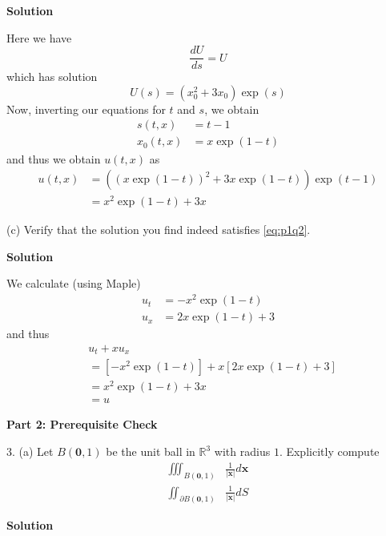\documentclass{article}
\begin{document}
\textbf{Solution}

Here we have
%
\begin{equation*}
    \frac{d U}{d s} = U
\end{equation*}
%
which has solution
%
\begin{equation*}
    U(s) = (x_0^2 + 3 x_0) \exp(s)
\end{equation*}
%
Now, inverting our equations for $t$ and $s$, we obtain
%
\begin{align*}
    s(t, x) &= t - 1 \\
    x_0(t, x) &= x \exp(1 - t)
\end{align*}
%
and thus we obtain $u(t, x)$ as
%
\begin{align*}
    u(t, x) &= ((x \exp(1 - t))^2 + 3 x \exp(1 - t)) \exp(t - 1) \\
            &= x^2 \exp(1 - t) + 3 x
\end{align*}
%

\vspace{5mm}
(c) Verify that the solution you find indeed satisfies \eqref{eq:p1q2}.

\textbf{Solution}

We calculate (using Maple)
%
\begin{align*}
    u_t &= -x^2 \exp(1 - t) \\
    u_x &= 2 x \exp(1 - t) + 3
\end{align*}
%
and thus
%
\begin{align*}
    &u_t + x u_x \\
    &= \left[
        -x^2 \exp(1 - t)
       \right]
       + x \left[
        2 x \exp(1 - t) + 3
       \right] \\
   &= x^2 \exp(1 - t) + 3 x \\
   &= u
\end{align*}

\vspace{5mm}
\textbf{Part 2: Prerequisite Check}

3. (a) Let $B(\mathbf{0},1)$ be the unit ball in $\mathbb{R}^{3}$ with
   radius $1$. Explicitly compute
%
\begin{align*}
    \iiint_{B(\mathbf{0},1)} &\frac{1}{|\mathbf{x}|} d \mathbf{x} \\
    \iint_{\partial B(\mathbf{0},1)} &\frac{1}{|\mathbf{x}|} d S
\end{align*}

\textbf{Solution}
\end{document}
